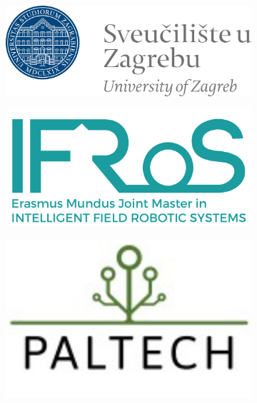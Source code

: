 \begin{titlepage}

    \begin{figure}[H]
    \centering
    \begin{subfigure}{0.3\textwidth}
        \centering
        \includegraphics[width=\textwidth]{Title/zagreb.png}
    \end{subfigure} 
    \hfill
    \begin{subfigure}{0.3\textwidth}
        \centering
        \includegraphics[width=\textwidth]{Title/LogoIFROS+frase+erasmus.png}
    \end{subfigure}
    \hfill
    \begin{subfigure}{0.3\textwidth}
        \centering
        \includegraphics[width=\textwidth]{Title/pal.png}
    \end{subfigure}
\end{figure}



\end{titlepage}
